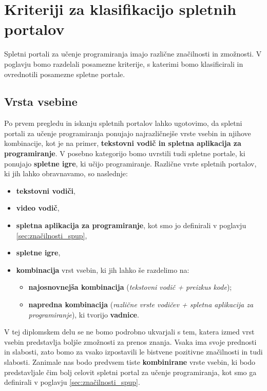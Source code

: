 \section{Kriteriji za klasifikacijo spletnih portalov}
\label{sec:kriteriji_za_klasifikacijo_spletnih_portalov}

Spletni portali za učenje programiranja imajo različne značilnosti in
zmožnosti. V poglavju bomo razdelali posamezne kriterije, s katerimi
bomo klasificirali in ovrednotili posamezne spletne portale.

\subsection{Vrsta vsebine}
\label{sec:Razvrstitev_spletnih_portalov}

Po prvem pregledu in iskanju spletnih portalov lahko ugotovimo, da
spletni portali za učenje programiranja ponujajo najrazličnejše vrste
vsebin in njihove kombinacije, kot je na primer, \textbf{tekstovni
  vodič in spletna aplikacija za programiranje}. V posebno kategorijo
bomo uvrstili tudi spletne portale, ki ponujajo \textbf{spletne igre},
ki učijo programiranje. Različne vrste spletnih portalov, ki jih lahko
obravnavamo, so naslednje:

\begin{itemize}
\tightlist
\item \textbf{tekstovni vodiči},
\item \textbf{video vodič},
\item \textbf{spletna aplikacija za programiranje}, kot smo jo
  definirali v poglavju \ref{sec:značilnosti_spup},
\item \textbf{spletne igre},
\item \textbf{kombinacija} vrst vsebin, ki jih lahko še razdelimo na:
  \begin{itemize}
    \tightlist
  \item \textbf{najosnovnejša kombinacija} (\emph{tekstovni vodič + preizkus kode});
  \item \textbf{napredna kombinacija} (\emph{različne vrste vodičev +
      spletna aplikacija za programiranje}), ki tvorijo \textbf{vadnice}.
  \end{itemize}
\end{itemize}

V tej diplomskem delu se ne bomo podrobno ukvarjali s tem, katera izmed vrst
vsebin predstavlja boljše zmožnosti za prenos znanja. Vsaka ima svoje
prednosti in slabosti, zato bomo za vsako izpostavili le bistvene
pozitivne značilnosti in tudi slabosti. Zanimale nas bodo predvsem
tiste \textbf{kombinirane} vrste vsebin, ki bodo predstavljale čim bolj
celovit spletni portal za učenje programiranja, kot smo ga definirali
v poglavju \ref{sec:značilnosti_spup}.


